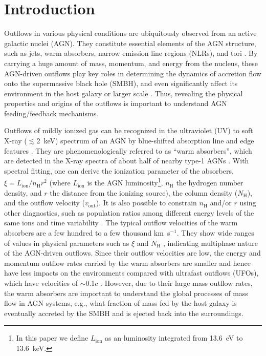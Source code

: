 \documentclass[twocolumn,times,twocolappendix]{aastex63}
\begin{document}

\section{Introduction}
\label{sec1}



Outflows in various physical conditions
are ubiquitously observed from an active
galactic nuclei (AGN). They constitute essential elements of the AGN
structure, such as jets, warm absorbers, narrow emission line regions
(NLRs), and tori \citep[e.g.,][]{Elitzur2006,Netzer2015,Wada2018b,Alonso-Herrero2021}. By carrying a
huge amount of mass, momentum, and energy from the nucleus, these
AGN-driven outflows play key roles in determining the dynamics of
accretion flow onto the supermassive black hole (SMBH), and even
significantly affect its environment in the host galaxy or larger
scale \citep[e.g.,][]{Fabian2012,Harrison2017,Veilleux2020}. Thus,
revealing the physical properties and origins of the outflows is
important to understand AGN feeding/feedback mechanisms.

Outflows of mildly ionized gas can be recognized in the ultraviolet (UV) to soft
X-ray ($\lesssim$2~keV) spectrum of an AGN by blue-shifted absorption
line and edge features \citep[see
  e.g.,][]{Kaastra2000,Kaastra2002}. They are phenomenologically
referred to as ``warm absorbers'', which are detected in
the X-ray spectra of about half of nearby type-1 AGNs
\citep[e.g.,][]{Reynolds1997,Laha2014}. With spectral fitting,
one can derive the ionization parameter of the absorbers,
$\xi = L_\mathrm{ion}/n_\mathrm{H}r^2$ (where $L_\mathrm{ion}$ is the
AGN luminosity\footnote{In this paper we define $L_\mathrm{ion}$ as an luminosity
integrated from 13.6~eV to 13.6~keV.}, $n_\mathrm{H}$ the hydrogen
number density, and $r$ the distance from the ionizing source), the
column density ($N_\mathrm{H}$), and the outflow velocity
($v_\mathrm{out}$).  It is also possible to constrain $n_\mathrm{H}$
and/or $r$ using other diagnostics, such as population ratios among
different energy levels of the same ions \citep[e.g.,][]{Mao2017} and time
variability \citep[e.g.,][]{Krongold2007}.  The typical outflow velocities of the warm absorbers
are a few hundred to a few thousand km~s$^{-1}$. They show wide
ranges of values in physical parameters such as $\xi$ and $N_\mathrm{H}$
\citep[e.g.,][]{Kaastra2002,Kaspi2004,Behar2017}, indicating
multiphase nature of the AGN-driven outflows. Since their outflow velocities are
low, the energy and momentum outflow rates carried by the warm absorbers
are smaller and hence have less impacts on the environments compared
with ultrafast outflows (UFOs), which have velocities of $\sim$0.1$c$
\citep[e.g.,][]{Tombesi2010}. However, due to their large mass outflow rates, the warm absorbers
are important to understand the global processes of mass flow in
AGN systems, e.g., what fraction of mass fed by the host galaxy is
eventually accreted by the SMBH and is ejected back into the
surroundings.
\end{document}
